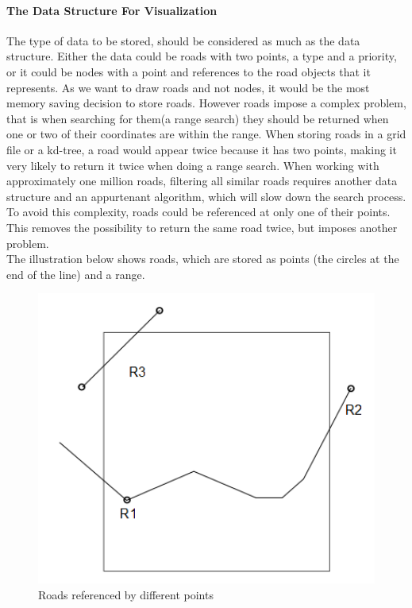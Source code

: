 \documentclass[a4paper,10pt,titlepage]{article}
\begin{document}
\paragraph{The Data Structure For Visualization}

The type of data to be stored, should be considered as much as the data structure. Either the data could be roads with two points, a type and a priority, or it could be nodes with a point and references to the road objects that it represents. As we want to draw roads and not nodes, it would be the most memory saving decision to store roads. However roads impose a complex problem, that is when searching for them(a range search) they should be returned when one or two of their coordinates are within the range. When storing roads in a grid file or a kd-tree, a road would appear twice because it has two points, making it very likely to return it twice when doing a range search. When working with approximately one million roads, filtering all similar roads requires another data structure and an appurtenant algorithm, which will slow down the search process. To avoid this complexity, roads could be referenced at only one of their points. This removes the possibility to return the same road twice, but imposes another problem.\\
The illustration below shows roads, which are stored as points (the circles at the end of the line) and a range.

\begin{figure}[H]
\includegraphics[width=120mm]{roadsRef.png}
\caption{Roads referenced by different points}
\label{fig:roads}
\end{figure}
\end{document}
